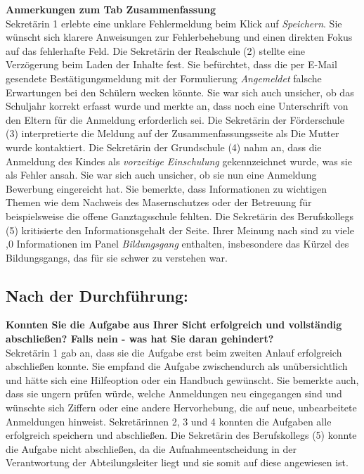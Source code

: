 \textbf{Anmerkungen zum Tab \glqq Zusammenfassung\grqq{}}\\
Sekretärin 1 erlebte eine unklare Fehlermeldung beim Klick auf \textit{Speichern}. Sie wünscht sich klarere Anweisungen zur Fehlerbehebung und einen direkten Fokus auf das fehlerhafte Feld.
Die Sekretärin der Realschule (2) stellte eine Verzögerung beim Laden der Inhalte fest. Sie befürchtet, dass die per E-Mail gesendete Bestätigungsmeldung mit der Formulierung \textit{Angemeldet} falsche Erwartungen bei den Schülern wecken könnte. Sie war sich auch unsicher, ob das Schuljahr korrekt erfasst wurde und merkte an, dass noch eine Unterschrift von den Eltern für die Anmeldung erforderlich sei.
Die Sekretärin der Förderschule (3) interpretierte die Meldung auf der Zusammenfassungsseite als \glqq Die Mutter wurde kontaktiert\grqq{}.
Die Sekretärin der Grundschule (4) nahm an, dass die Anmeldung des Kindes als \textit{vorzeitige Einschulung} gekennzeichnet wurde, was sie als Fehler ansah. Sie war sich auch unsicher, ob sie nun eine \glqq Anmeldung Bewerbung\grqq{} eingereicht hat. Sie bemerkte, dass Informationen zu wichtigen Themen wie dem Nachweis des Masernschutzes oder der Betreuung für beispielsweise die offene Ganztagsschule fehlten.
Die Sekretärin des Berufskollegs (5) kritisierte den Informationsgehalt der Seite. Ihrer Meinung nach sind zu viele ,0
Informationen im Panel \textit{Bildungsgang} enthalten, insbesondere das Kürzel des Bildungsgangs, das für sie schwer zu verstehen war.

\subsection{Nach der Durchführung:}

\textbf{Konnten Sie die Aufgabe aus Ihrer Sicht erfolgreich und vollständig abschließen? Falls nein - was hat Sie daran gehindert?}\\
Sekretärin 1 gab an, dass sie die Aufgabe erst beim zweiten Anlauf erfolgreich abschließen konnte. Sie empfand die Aufgabe zwischendurch als unübersichtlich und hätte sich eine Hilfeoption oder ein Handbuch gewünscht. Sie bemerkte auch, dass sie ungern prüfen würde, welche Anmeldungen neu eingegangen sind und wünschte sich Ziffern oder eine andere Hervorhebung, die auf neue, unbearbeitete Anmeldungen hinweist.
Sekretärinnen 2, 3 und 4 konnten die Aufgaben alle erfolgreich speichern und abschließen. 
Die Sekretärin des Berufskollegs (5) konnte die Aufgabe nicht abschließen, da die Aufnahmeentscheidung in der Verantwortung der Abteilungsleiter liegt und sie somit auf diese angewiesen ist. 

